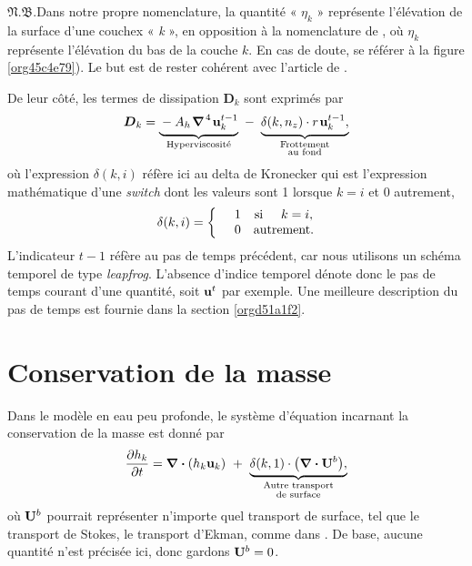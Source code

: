 \documentclass[10pt]{report}
\numberwithin{equation}{section}
\newcommand{\uu}{\vb{u}}
\newcommand{\tall}{\vphantom{pA^{x^x}_p}}
\newcommand{\pt}{\hspace{1pt}} %
\newcommand{\nb}{\underline{{\footnotesize\EightStarConvex}\pt $\mathfrak{N.B.}$\vphantom{p}}\hspace{3pt}}
\begin{document}
\nb Dans notre propre nomenclature, la quantité « \(\eta_k\) » représente l'élévation de la surface d'une couchex « \emph{k} », en opposition à la nomenclature de \Textcite{vallis_2006}, où \(\eta_k\) représente l'élévation du bas de la couche \(k\).
En cas de doute, se référer à la figure \ref{org45c4e79}).
Le but est de rester cohérent avec l'article de \textcite{chen_2021}.
\bigskip

De leur côté, les termes de dissipation \(\boldsymbol{D}_k\) sont exprimés par
\begin{equation}
   \boldsymbol{D}_k = \underbrace{\tall-A_h\pt\gradient^{\pt4}\pt\uu^{t-1}_k}_\text{Hyperviscosité}
   \ - \ \underbrace{\tall\delta(k,n_z) \cdot r\pt \uu^{t-1}_k,}_{\substack{\text{Frottement}\\\text{au fond}}}
\end{equation}
où l'expression \(\delta(k,i)\) réfère ici au delta de Kronecker qui est l'expression mathématique d'une \emph{switch} dont les valeurs sont 1 lorsque \(k=i\) et 0 autrement,
\begin{equation}
   \delta(k,i) = \left\lbrace \hspace{0.2cm}\begin{matrix}
     \hspace{0.3cm}1 & \text{si}\hspace{0.5cm} k=i, \\
     \hspace{0.3cm}0 & \text{autrement}.
   \end{matrix}\right.
\end{equation}
L'indicateur \(t-1\) réfère au pas de temps précédent, car nous utilisons un schéma temporel de type \emph{leapfrog}.
L'absence d'indice temporel dénote donc le pas de temps courant d'une quantité, soit \(\uu^t\) par exemple. 
Une meilleure description du pas de temps est fournie dans la section \ref{orgd51a1f2}. \bigskip
\section{Conservation de la masse}
\label{sec:orgc7d686c}

Dans le modèle en eau peu profonde, le système d'équation incarnant la conservation de la masse est donné par
\begin{equation}
   \pdv{h_k}{t} =  \divergence(h_k\uu_k)\ +\ \underbrace{\delta(k,1)\cdot \qty(\divergence{\vb{U}^b}),}_{\substack{\text{Autre transport}\\ \text{de surface}}}
\end{equation}
où \(\vb{U}^b\) pourrait représenter n'importe quel transport de surface, tel que le transport de Stokes, le transport d'Ekman, comme dans \Textcite{chen_2021}.
De base, aucune quantité n'est précisée ici, donc gardons \(\vb{U}^b = 0\). 
\end{document}
